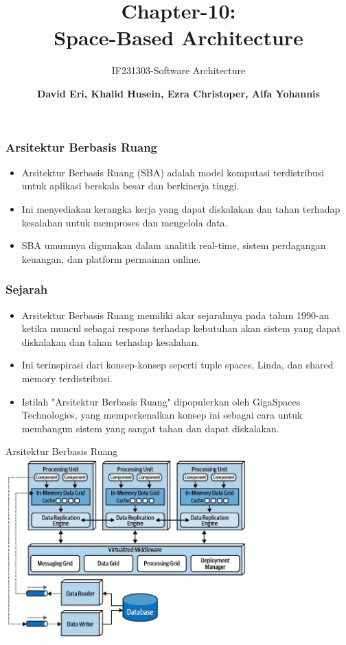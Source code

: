 \documentclass[aspectratio=169, table]{beamer}
\subtitle{IF231303-Software Architecture}
\title{\huge Chapter-10:\\Space-Based Architecture}
\author[Pradita]{\small {\textbf{David Eri, Khalid Husein, Ezra Christoper, Alfa Yohannis}}}
\begin{document}
    \frame{\titlepage}

    \begin{frame}
        \frametitle{Arsitektur Berbasis Ruang}
        \begin{itemize}
            \item Arsitektur Berbasis Ruang (SBA) adalah model komputasi terdistribusi untuk aplikasi berskala besar dan berkinerja tinggi.
            \item Ini menyediakan kerangka kerja yang dapat diskalakan dan tahan terhadap kesalahan untuk memproses dan mengelola data.
            \item SBA umumnya digunakan dalam analitik real-time, sistem perdagangan keuangan, dan platform permainan online.
        \end{itemize}
    \end{frame}

    \begin{frame}
        \frametitle{Sejarah}
        \begin{itemize}
            \item Arsitektur Berbasis Ruang memiliki akar sejarahnya pada tahun 1990-an ketika muncul sebagai respons terhadap kebutuhan akan sistem yang dapat diskalakan dan tahan terhadap kesalahan.
            \item Ini terinspirasi dari konsep-konsep seperti tuple spaces, Linda, dan shared memory terdistribusi.
            \item Istilah "Arsitektur Berbasis Ruang" dipopulerkan oleh GigaSpaces Technologies, yang memperkenalkan konsep ini sebagai cara untuk membangun sistem yang sangat tahan dan dapat diskalakan.
        \end{itemize}
    \end{frame}

    \begin{frame}{Arsitektur Berbasis Ruang}
        \vspace{30pt}
        \centering
        \includegraphics[width=0.7\textwidth]{../../images/spaced-based_architecture}
    \end{frame}
\end{document}
